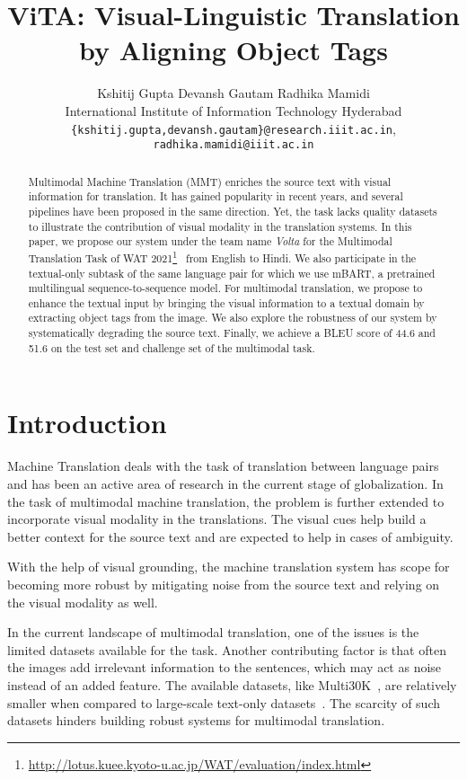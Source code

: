 \documentclass[11pt,a4paper]{article}
\title{ViTA: Visual-Linguistic Translation by Aligning Object Tags}
\author{Kshitij Gupta \qquad Devansh Gautam \qquad Radhika Mamidi \\
  International Institute of Information Technology Hyderabad \\
  \texttt{\{kshitij.gupta,devansh.gautam\}@research.iiit.ac.in},\\ \texttt{radhika.mamidi@iiit.ac.in}
}
\date{}
\begin{document}
\maketitle
\begin{abstract}

Multimodal Machine Translation (MMT) enriches the source text with visual information for translation. It has gained popularity in recent years, and several pipelines have been proposed in the same direction.
Yet, the task lacks quality datasets to illustrate the contribution of visual modality in the translation systems.
In this paper, we propose our system under the team name \textit{Volta} for the Multimodal Translation Task of WAT 2021\footnote{\url{http://lotus.kuee.kyoto-u.ac.jp/WAT/evaluation/index.html}}~\citep{nakazawa-etal-2021-overview} from English to Hindi. We also participate in the textual-only subtask of the same language pair for which we use mBART, a pretrained multilingual sequence-to-sequence model.
For multimodal translation, we propose to enhance the textual input by bringing the visual information to a textual domain by extracting object tags from the image.
We also explore the robustness of our system by systematically degrading the source text. Finally, we achieve a BLEU score of 44.6 and 51.6 on the test set and challenge set of the multimodal task.
\end{abstract}

\section{Introduction}

Machine Translation deals with the task of translation between language pairs and has been an active area of research in the current stage of globalization.
In the task of multimodal machine translation, the problem is further extended to incorporate visual modality in the translations. The visual cues help build a better context for the source text and are expected to help in cases of ambiguity.

With the help of visual grounding, the machine translation system has scope for becoming more robust by mitigating noise from the source text and relying on the visual modality as well.

In the current landscape of multimodal translation, one of the issues is the limited datasets available for the task. Another contributing factor is that often the images add irrelevant information to the sentences, which may act as noise instead of an added feature. The available datasets, like Multi30K~\citep{W16-3210}, are relatively smaller when compared to large-scale text-only datasets~\citep{DBLP:journals/corr/BahdanauCB14}. The scarcity of such datasets hinders building robust systems for multimodal translation.
\end{document}
